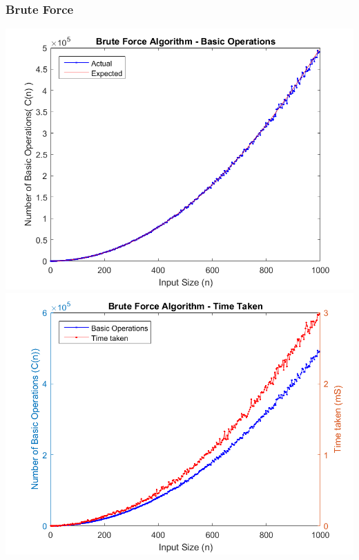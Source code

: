 \documentclass{article}
\begin{document}
        \subsubsection{Brute Force}
            \includegraphics[scale=0.7]{Images/brute_algorithm_basic_operations.png}\\
            \includegraphics[scale=0.7]{Images/brute_algorithm_time_taken.png}
\end{document}
